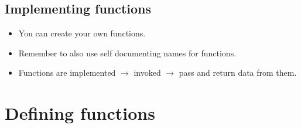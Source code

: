 \subsection{Implementing functions}
\begin{itemize}
    \item You can create your own functions. 
    \item Remember to also use self documenting names for functions. 
    \item Functions are implemented $\rightarrow$ invoked $\rightarrow$ pass and return data from them. 
\end{itemize}

\section{Defining functions}

